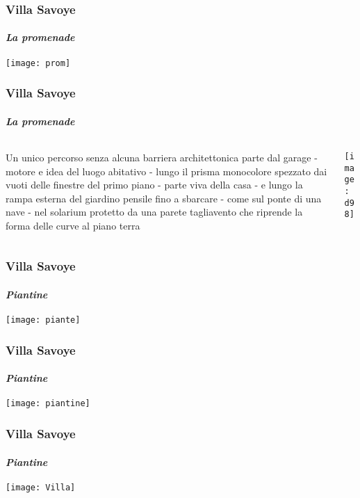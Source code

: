 \documentclass{beamer}
\begin{document}
\usebackgroundtemplate{}

\begin{frame}
\frametitle{Villa Savoye}
\framesubtitle{\textit{La promenade}}

\texttt{[image: prom]}

\end{frame}

\begin{frame}
\frametitle{Villa Savoye}
\framesubtitle{\textit{La promenade}}


\begin{columns}
\begin{column}{0.5\textwidth}

Un unico percorso senza alcuna barriera architettonica parte dal garage - motore e idea del luogo abitativo - lungo il prisma monocolore spezzato dai vuoti delle finestre del primo piano - parte viva della casa - e lungo la rampa esterna del giardino pensile fino a sbarcare - come sul ponte di una nave - nel solarium  protetto da una parete tagliavento che riprende la forma delle curve al piano terra

\end{column}

\begin{column}{0.5\textwidth}

\texttt{[image: d98]}

\end{column}
\end{columns}
\end{frame}

\begin{frame}

\frametitle{Villa Savoye}
\framesubtitle{\textit{Piantine}}

\texttt{[image: piante]}

\end{frame}

\begin{frame}

\frametitle{Villa Savoye}
\framesubtitle{\textit{Piantine}}

\texttt{[image: piantine]}

\end{frame}

\begin{frame}

\frametitle{Villa Savoye}
\framesubtitle{\textit{Piantine}}

\texttt{[image: Villa]}

\end{frame}
\end{document}
